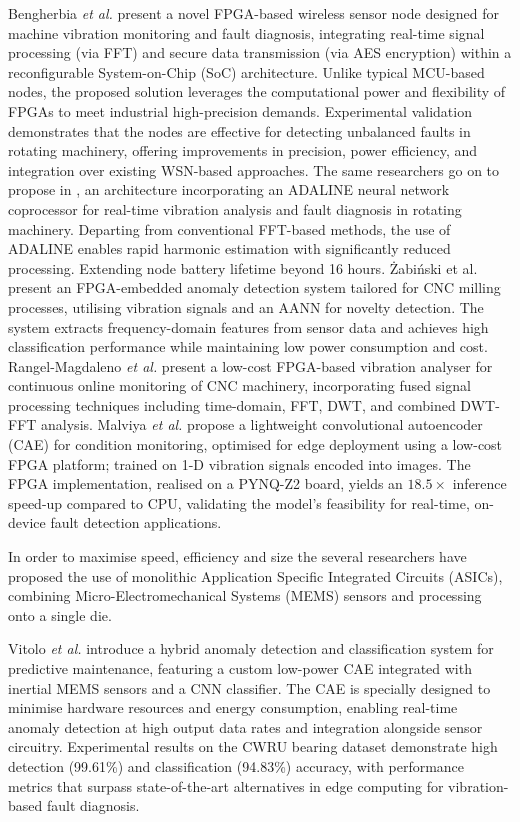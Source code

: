 \documentclass[../main.tex]{subfiles}
\begin{document}
Bengherbia \textit{et al.} \cite{RN2} present a novel FPGA-based wireless sensor node designed for machine vibration monitoring and fault diagnosis, integrating real-time signal processing (via FFT) and secure data transmission (via AES encryption) within a reconfigurable System-on-Chip (SoC) architecture. Unlike typical MCU-based nodes, the proposed solution leverages the computational power and flexibility of FPGAs to meet industrial high-precision demands. Experimental validation demonstrates that the nodes are effective for detecting unbalanced faults in rotating machinery, offering improvements in precision, power efficiency, and integration over existing WSN-based approaches. The same researchers go on to propose in \cite{RN1}, an architecture incorporating an ADALINE neural network coprocessor for real-time vibration analysis and fault diagnosis in rotating machinery. Departing from conventional FFT-based methods, the use of ADALINE enables rapid harmonic estimation with significantly reduced processing. Extending node battery lifetime beyond 16 hours. Żabiński et al. \cite{RN10} present an FPGA-embedded anomaly detection system tailored for CNC milling processes, utilising vibration signals and an AANN for novelty detection. The system extracts frequency-domain features from sensor data and achieves high classification performance while maintaining low power consumption and cost. Rangel-Magdaleno \textit{et al.} \cite{RN11} present a low-cost FPGA-based vibration analyser for continuous online monitoring of CNC machinery, incorporating fused signal processing techniques including time-domain, FFT, DWT, and combined DWT-FFT analysis. Malviya \textit{et al.} \cite{RN7} propose a lightweight convolutional autoencoder (CAE) for condition monitoring, optimised for edge deployment using a low-cost FPGA platform; trained on 1-D vibration signals encoded into images. The FPGA implementation, realised on a PYNQ-Z2 board, yields an $18.5\times$ inference speed-up compared to CPU, validating the model's feasibility for real-time, on-device fault detection applications. 

In order to maximise speed, efficiency and size the several researchers have proposed the use of monolithic Application Specific Integrated Circuits (ASICs), combining Micro-Electromechanical Systems (MEMS) sensors and processing onto a single die.

Vitolo \textit{et al.} \cite{RN5} introduce a hybrid anomaly detection and classification system for predictive maintenance, featuring a custom low-power CAE integrated with inertial MEMS sensors and a CNN classifier. The CAE is specially designed to minimise hardware resources and energy consumption, enabling real-time anomaly detection at high output data rates and integration alongside sensor circuitry. Experimental results on the CWRU bearing dataset demonstrate high detection (99.61\%) and classification (94.83\%) accuracy, with performance metrics that surpass state-of-the-art alternatives in edge computing for vibration-based fault diagnosis.
\end{document}
